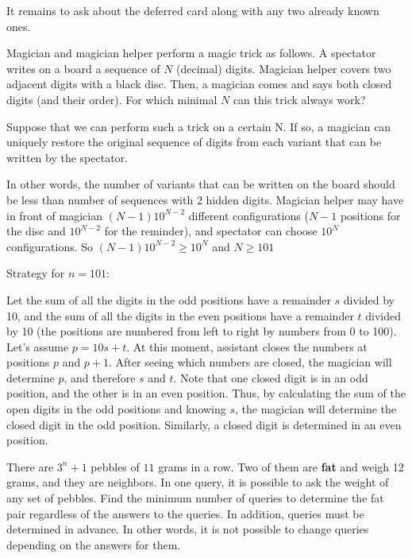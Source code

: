 It remains to ask about the deferred card along with any two already known ones.

\begin{example} [Russia 1997]
    Magician and magician helper perform a magic trick as follows. A spectator writes on a board a sequence of $N$ (decimal) digits. Magician helper covers two adjacent digits with a black disc. Then, a magician comes and says both closed digits (and their order). For which minimal $N$ can this trick always work? 
\end{example}

\sol Suppose that we can perform such a trick on a certain N. If so, a magician can uniquely restore the original sequence of digits from each variant that can be written by the spectator. 

In other words, the number of variants that can be written on the board should be less than number of sequences with 2 hidden digits. Magician helper may have in front of magician $(N-1)10^{N-2}$ different configurations ($N-1$ positions for the disc and $10^{N-2}$ for the reminder), and spectator can choose $10^{N}$ configurations. So $(N-1)10^{N-2}\geq 10^{N}$ and $N\geq 101$

Strategy for $n=101$:

Let the sum of all the digits in the odd positions have a remainder $s$ divided by 10, and the sum of all the digits in the even positions have a remainder $t$ divided by 10 (the positions are numbered from left to right by numbers from 0 to 100). Let's assume $p = 10s + t$. At this moment, assistant closes the numbers at positions $p$ and $p + 1$.  After seeing which numbers are closed, the magician will determine $p$, and therefore $s$ and $t$. Note that one closed digit is in an odd position, and the other is in an even position. Thus, by calculating the sum of the open digits in the odd positions and knowing $s$, the magician will determine the closed digit in the odd position. Similarly, a closed digit is determined in an even position.

\begin{example} [IMSC 2025]
    There are $3^n+1$ pebbles of $11$ grams in a row. Two of them are \textbf{fat} and weigh 12 grams, and they are neighbors. In one query, it is possible to ask the weight of any set of pebbles. Find the minimum number of queries to determine the fat pair regardless of the answers to the queries. In addition, queries must be determined in advance. In other words, it is not possible to change queries depending on the answers for them. 
\end{example}

